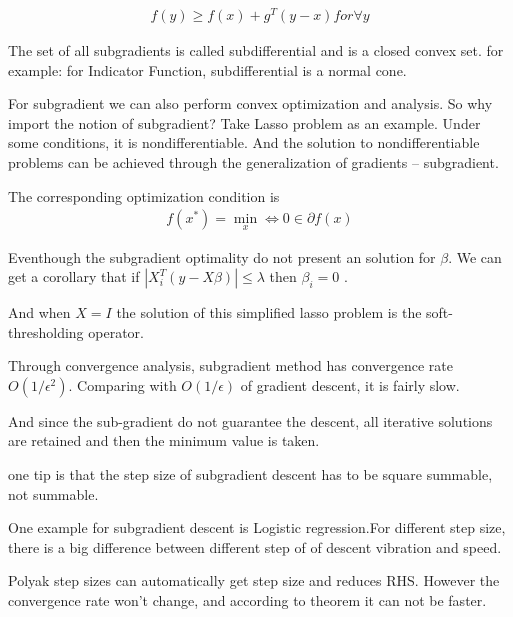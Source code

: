 \documentclass[aps,letterpaper,10pt]{article}
\begin{document}
\begin{align*}
  f(y) \geq f(x) + g^{T}(y-x) for \forall y
\end{align*}


The set of all subgradients is called subdifferential and is a closed convex set. for example: for Indicator Function, subdifferential is a normal cone.\vspace{3mm}

For subgradient we can also perform convex optimization and analysis. So why import the notion of subgradient? Take Lasso problem as an example. Under some conditions, it is nondifferentiable. And the solution to nondifferentiable problems can be achieved through the generalization of gradients -- subgradient.\vspace{3mm}

The corresponding optimization condition is
\begin{align*}
  f(x^{*}) = \mathop{min}\limits_{x} \Leftrightarrow 0 \in \partial f(x)
\end{align*}


Eventhough the subgradient optimality do not present an solution for $\beta$. We can get a corollary that if $|X_i^{T}(y-X\beta)| \leq \lambda$ then $\beta_i =0$ .\vspace{3mm}

And when $X=I$ the solution of this simplified lasso problem is the soft-thresholding operator.\vspace{3mm}

Through convergence analysis, subgradient method has convergence rate $O(1/\epsilon^2)$. Comparing with $O(1/\epsilon)$ of gradient descent, it is fairly slow.\vspace{3mm}

And since the sub-gradient do not guarantee the descent, all iterative solutions are retained and then the minimum value is taken.\vspace{3mm}

one tip is that the step size of subgradient descent has to be square summable, not summable.\vspace{3mm}

One example for subgradient descent is Logistic regression.For different step size, there is a big difference between different step of of descent vibration and speed.\vspace{3mm}

Polyak step sizes can automatically get step size and reduces RHS. However the convergence rate won't change, and according to theorem it can not be faster.\vspace{3mm}
\end{document}
